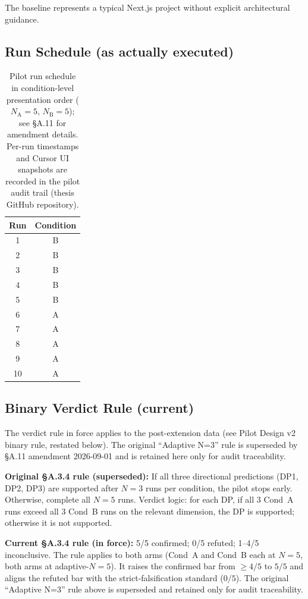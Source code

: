 The baseline represents a typical Next.js project without explicit architectural guidance.

\subsection{Run Schedule (as actually executed)}

\begin{table}[H]
\centering
\begin{tabular}{cc}
\toprule
\textbf{Run} & \textbf{Condition} \\
\midrule
1 & B \\
2 & B \\
3 & B \\
4 & B \\
5 & B \\
6 & A \\
7 & A \\
8 & A \\
9 & A \\
10 & A \\
\bottomrule
\end{tabular}
\caption{Pilot run schedule in condition-level presentation order ($N_{\mathrm{A}}=5$, $N_{\mathrm{B}}=5$); see \S A.11 for amendment details. Per-run timestamps and Cursor UI snapshots are recorded in the pilot audit trail (thesis GitHub repository).}
\label{tab:run-schedule}
\end{table}

\subsection{Binary Verdict Rule (current)}

The verdict rule in force applies to the post-extension data (see Pilot Design v2 binary rule, restated below). The original ``Adaptive N=3'' rule is superseded by \S A.11 amendment 2026-09-01 and is retained here only for audit traceability.

\textbf{Original \S A.3.4 rule (superseded):} If all three directional predictions (DP1, DP2, DP3) are supported after $N=3$ runs per condition, the pilot stops early. Otherwise, complete all $N=5$ runs. Verdict logic: for each DP, if all 3 Cond~A runs exceed all 3 Cond~B runs on the relevant dimension, the DP is supported; otherwise it is not supported.

\textbf{Current \S A.3.4 rule (in force):} 5/5 confirmed; 0/5 refuted; 1--4/5 inconclusive. The rule applies to both arms (Cond~A and Cond~B each at $N=5$, both arms at adaptive-$N=5$). It raises the confirmed bar from $\geq 4/5$ to $5/5$ and aligns the refuted bar with the strict-falsification standard ($0/5$). The original ``Adaptive N=3'' rule above is superseded and retained only for audit traceability.

